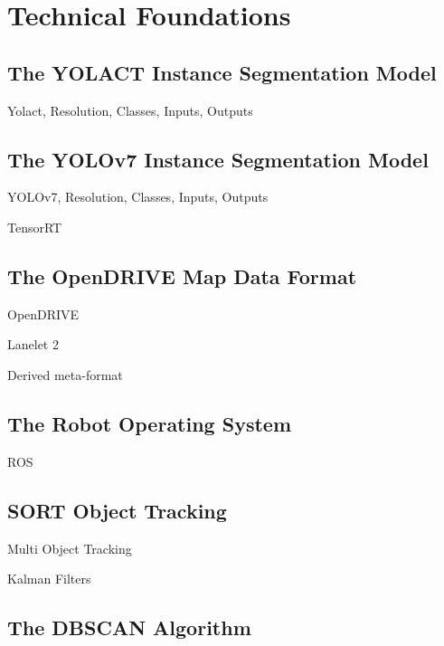
\chapter{Technical Foundations}
\label{ch:tech}

\section{The YOLACT Instance Segmentation Model}
\label{sec:yolact}

Yolact, Resolution, Classes, Inputs, Outputs

\section{The YOLOv7 Instance Segmentation Model}
\label{sec:yolovseven}

YOLOv7, Resolution, Classes, Inputs, Outputs \par
TensorRT


\section{The OpenDRIVE Map Data Format}
\label{sec:opendrive}

OpenDRIVE \par
Lanelet 2 \par
Derived meta-format


\section{The Robot Operating System}
\label{sec:ros}

ROS

\section{SORT Object Tracking}
\label{sec:sort}

Multi Object Tracking \par
Kalman Filters


\section{The DBSCAN Algorithm}
\label{sec:dbscan}

